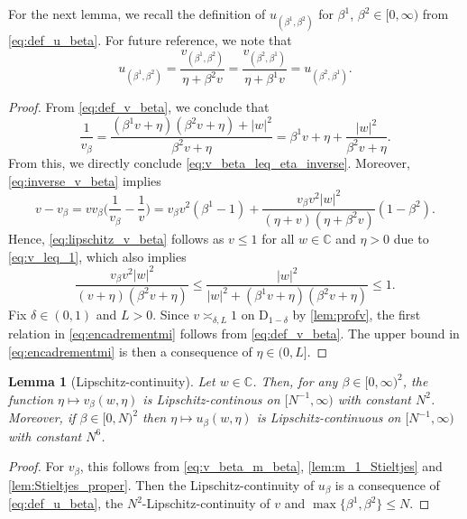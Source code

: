 \documentclass[10pt,a4paper]{amsart}
\newcommand{\abs}[1]{\left| #1 \right|}
\newcommand{\C}{\mathbb{C}}
\newtheorem{lemma}{Lemma}[section]
\numberwithin{equation}{section}
\begin{document}
	
	
		For the next lemma, we recall  the definition of $u_{(\beta^1,\beta^2)}$ for $\beta^1$, $\beta^2 \in [0,\infty)$ from \cref{eq:def_u_beta}. 
		For future reference, we note that 
	\begin{equation}\label{eq:def_u_beta2}
		u_{(\beta^1,\beta^2)} = \frac{v_{(\beta^1,\beta^2)}}{\eta + \beta^2 v} = \frac{v_{(\beta^2,\beta^1)}}{\eta + \beta^1 v} = u_{{(\beta^2,\beta^1)}}.
	\end{equation}	
	
\begin{proof}
		From \eqref{eq:def_v_beta}, we conclude that 
		\begin{equation}\label{eq:inverse_v_beta}
			\frac{1}{v_\beta} =\frac{(\beta^1 v + \eta)(\beta^{2}v + \eta) + |w|^{2}}{\beta^{2}v + \eta}= \beta^1 v + \eta + \frac{|w|^2}{\beta^{2}v + \eta}.
		\end{equation}
		From this, we directly conclude \eqref{eq:v_beta_leq_eta_inverse}. 
		Moreover, \eqref{eq:inverse_v_beta} implies 
		\[ v - v_\beta = v v_\beta \bigg( \frac{1}{v_\beta} - \frac{1}{v} \bigg) = v_{\beta} v^2 (\beta^1-1) + 
		\frac{v_\beta v^2\abs{w}^2}{(\eta + v)(\eta + \beta^2 v)}(1-\beta^2). 
		\] 
		Hence, \eqref{eq:lipschitz_v_beta} follows as
		$v\leq 1$ for all $w \in \C$ and $\eta>0$ due to \eqref{eq:v_leq_1}, which also implies 
		\[ 
		\frac{v_\beta v^2 |w|^2}{(v+\eta)\left( \beta^{2}v + \eta \right)} \le \frac{|w|^2}{|w|^2 +  \left(\beta^{1}v+\eta \right) \left(\beta^{2}v+\eta \right)} \le 1. 
		\] 
		Fix $\delta \in (0,1)$ and $L>0$. 
		Since $v\asymp_{\delta,L} 1$ on $\mathrm{D}_{1-\delta}$ by \cref{lem:profv}, the first relation in \eqref{eq:encadrementmi} follows from \eqref{eq:def_v_beta}. The upper bound in \eqref{eq:encadrementmi} is then a 
		consequence of $\eta \in (0,L]$. 
	\end{proof}
	
	
	
	\begin{lemma}[Lipschitz-continuity] \label{lem:v_beta_u_beta_Lipschitz} 
		Let $w \in \C$. Then, for any $\beta \in [0,\infty)^2$, the function $\eta \mapsto v_\beta(w,\eta)$ is Lipschitz-continous on $[N^{-1}, \infty)$ with constant $N^2$. Moreover, if $\beta \in [0,N)^2$ then $\eta \mapsto u_\beta(w,\eta)$ is 
		Lipschitz-continuous on $[N^{-1},\infty)$ with constant $N^6$. 
	\end{lemma} 
	
	\begin{proof} 
	For $v_\beta$, this follows from \cref{eq:v_beta_m_beta}, \cref{lem:m_1_Stieltjes} 
	and \cref{lem:Stieltjes_proper}.  Then the Lipschitz-continuity of $u_\beta$ is 
	a consequence of \cref{eq:def_u_beta}, the $N^2$-Lipschitz-continuity of $v$ and 
	$\max\{\beta^1,\beta^2\} \leq N$. 
	\end{proof} 
	
\end{document}
